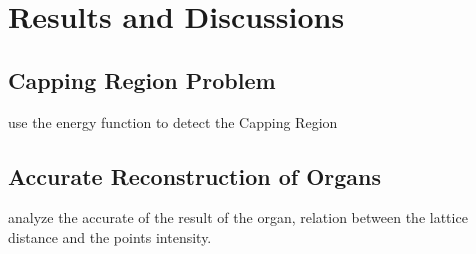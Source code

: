 \documentclass[3p,times]{elsarticle}
\begin{document}
\section{Results and Discussions}
\label{section4}
\subsection{Capping Region Problem} 
use the energy function to  detect the Capping Region
\subsection{Accurate Reconstruction of Organs}
analyze the accurate of the result of the organ, relation between the
lattice distance and the points intensity.











\end{document}
